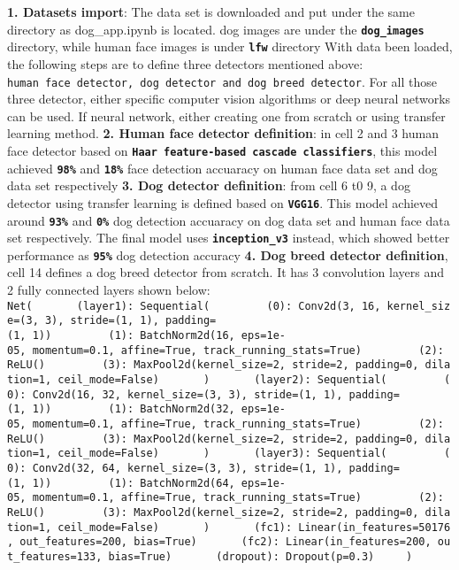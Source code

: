 \documentclass[11pt]{article}
\begin{document}
\textbf{1. Datasets import}: The data set is downloaded and put under
the same directory as dog\_app.ipynb is located. dog images are under
the \textbf{\texttt{dog\_images}} directory, while human face images is
under \textbf{\texttt{lfw}} directory With data been loaded, the
following steps are to define three detectors mentioned above:
\texttt{human\ face\ detector,\ dog\ detector\ and\ dog\ breed\ detector}.
For all those three detector, either specific computer vision algorithms
or deep neural networks can be used. If neural network, either creating
one from scratch or using transfer learning method. \textbf{2. Human
face detector definition}: in cell 2 and 3 human face detector based on
\textbf{\texttt{Haar\ feature-based\ cascade\ classifiers}}, this model
achieved \textbf{\texttt{98\%}} and \textbf{\texttt{18\%}} face
detection accuaracy on human face data set and dog data set respectively
\textbf{3. Dog detector definition}: from cell 6 t0 9, a dog detector
using transfer learning is defined based on \textbf{\texttt{VGG16}}.
This model achieved around \textbf{\texttt{93\%}} and
\textbf{\texttt{0\%}} dog detection accuaracy on dog data set and human
face data set respectively. The final model uses
\textbf{\texttt{inception\_v3}} instead, which showed better performance
as \textbf{\texttt{95\%}} dog detection accuracy \textbf{4. Dog breed
detector definition}, cell 14 defines a dog breed detector from scratch.
It has 3 convolution layers and 2 fully connected layers shown below:
\texttt{Net(\ \ \ \ \ \ \ (layer1):\ Sequential(\ \ \ \ \ \ \ \ \ (0):\ Conv2d(3,\ 16,\ kernel\_size=(3,\ 3),\ stride=(1,\ 1),\ padding=(1,\ 1))\ \ \ \ \ \ \ \ \ (1):\ BatchNorm2d(16,\ eps=1e-05,\ momentum=0.1,\ affine=True,\ track\_running\_stats=True)\ \ \ \ \ \ \ \ \ (2):\ ReLU()\ \ \ \ \ \ \ \ \ (3):\ MaxPool2d(kernel\_size=2,\ stride=2,\ padding=0,\ dilation=1,\ ceil\_mode=False)\ \ \ \ \ \ \ )\ \ \ \ \ \ \ (layer2):\ Sequential(\ \ \ \ \ \ \ \ \ (0):\ Conv2d(16,\ 32,\ kernel\_size=(3,\ 3),\ stride=(1,\ 1),\ padding=(1,\ 1))\ \ \ \ \ \ \ \ \ (1):\ BatchNorm2d(32,\ eps=1e-05,\ momentum=0.1,\ affine=True,\ track\_running\_stats=True)\ \ \ \ \ \ \ \ \ (2):\ ReLU()\ \ \ \ \ \ \ \ \ (3):\ MaxPool2d(kernel\_size=2,\ stride=2,\ padding=0,\ dilation=1,\ ceil\_mode=False)\ \ \ \ \ \ \ )\ \ \ \ \ \ \ (layer3):\ Sequential(\ \ \ \ \ \ \ \ \ (0):\ Conv2d(32,\ 64,\ kernel\_size=(3,\ 3),\ stride=(1,\ 1),\ padding=(1,\ 1))\ \ \ \ \ \ \ \ \ (1):\ BatchNorm2d(64,\ eps=1e-05,\ momentum=0.1,\ affine=True,\ track\_running\_stats=True)\ \ \ \ \ \ \ \ \ (2):\ ReLU()\ \ \ \ \ \ \ \ \ (3):\ MaxPool2d(kernel\_size=2,\ stride=2,\ padding=0,\ dilation=1,\ ceil\_mode=False)\ \ \ \ \ \ \ )\ \ \ \ \ \ \ (fc1):\ Linear(in\_features=50176,\ out\_features=200,\ bias=True)\ \ \ \ \ \ \ (fc2):\ Linear(in\_features=200,\ out\_features=133,\ bias=True)\ \ \ \ \ \ \ (dropout):\ Dropout(p=0.3)\ \ \ \ \ )}
\end{document}
